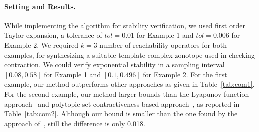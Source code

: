 \paragraph{Setting and Results.}  While implementing the algorithm for
stability verification, we used first order Taylor expansion, a
tolerance of $tol=0.01$ for Example 1 and $tol=0.006$ for Example 2.
We required $k=3$ number of reachability operators for both examples,
for synthesizing a suitable template complex zonotope used in checking
contraction.  We could verify exponential stability in a sampling
interval $[0.08, 0.58]$ for Example 1 and $[0.1,0.496]$ for Example 2.
For the first example, our method outperforms other approaches as
given in Table~\ref{tab:com1}.  For the second example, our method
larger bounds than the Lyapunov function approach~\cite{2013hetel} and
polytopic set contractiveness based
approach~\cite{2014-fiacchini-set}, as reported in
Table~\ref{tab:com2}.  Although our bound is smaller than the one
found by the approach of~\cite{AlKhatib2015}, still the difference is
only 0.018.
